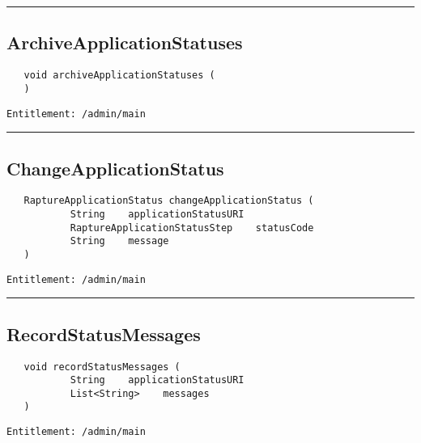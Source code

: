 \rule{12cm}{2pt}
\subsection{ArchiveApplicationStatuses}
\label{Api:ArchiveApplicationStatuses}
\begin{Verbatim}
   void archiveApplicationStatuses (
   )
\end{Verbatim}
\begin{Verbatim}[formatcom=\color{Maroon}]
  Entitlement: /admin/main
\end{Verbatim}



\rule{12cm}{2pt}
\subsection{ChangeApplicationStatus}
\label{Api:ChangeApplicationStatus}
\begin{Verbatim}
   RaptureApplicationStatus changeApplicationStatus (
           String    applicationStatusURI
           RaptureApplicationStatusStep    statusCode
           String    message
   )
\end{Verbatim}
\begin{Verbatim}[formatcom=\color{Maroon}]
  Entitlement: /admin/main
\end{Verbatim}



\rule{12cm}{2pt}
\subsection{RecordStatusMessages}
\label{Api:RecordStatusMessages}
\begin{Verbatim}
   void recordStatusMessages (
           String    applicationStatusURI
           List<String>    messages
   )
\end{Verbatim}
\begin{Verbatim}[formatcom=\color{Maroon}]
  Entitlement: /admin/main
\end{Verbatim}



